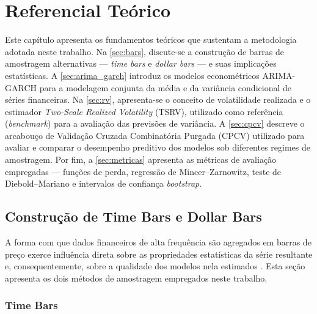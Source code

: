 \chapter{Referencial Teórico}
\label{cap:referencial}

Este capítulo apresenta os fundamentos teóricos que sustentam a metodologia
adotada neste trabalho. Na \autoref{sec:bars}, discute-se a construção de
barras de amostragem alternativas --- \emph{time bars} e \emph{dollar bars}
--- e suas implicações estatísticas. A \autoref{sec:arima_garch} introduz os
modelos econométricos ARIMA-GARCH para a modelagem conjunta da média e da
variância condicional de séries financeiras. Na \autoref{sec:rv}, apresenta-se
o conceito de volatilidade realizada e o estimador \emph{Two-Scale Realized
Volatility} (TSRV), utilizado como referência (\emph{benchmark}) para a
avaliação das previsões de variância. A \autoref{sec:cpcv} descreve o
arcabouço de Validação Cruzada Combinatória Purgada (CPCV) utilizado para
avaliar e comparar o desempenho preditivo dos modelos sob diferentes regimes
de amostragem. Por fim, a \autoref{sec:metricas} apresenta as métricas de
avaliação empregadas --- funções de perda, regressão de Mincer--Zarnowitz,
teste de Diebold--Mariano e intervalos de confiança \emph{bootstrap}.

\section{Construção de Time Bars e Dollar Bars}
\label{sec:bars}

A forma com que dados financeiros de alta frequência são agregados em barras
de preço exerce influência direta sobre as propriedades estatísticas da série
resultante e, consequentemente, sobre a qualidade dos modelos nela
estimados \cite{lopez2018advances}. Esta seção apresenta os dois métodos de
amostragem empregados neste trabalho.

\subsection{Time Bars}
\label{subsec:time_bars}


